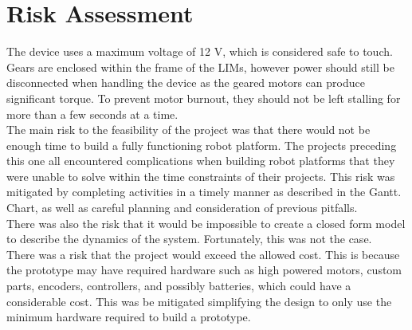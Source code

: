\chapter{Risk Assessment}

The device uses a maximum voltage of 12 V, which is considered safe to touch. Gears are enclosed within the frame of the LIMs, however power should still be disconnected when handling the device as the geared motors can produce significant torque. To prevent motor burnout, they should not be left stalling for more than a few seconds at a time.\\

\noindent The main risk to the feasibility of the project was that there would not be enough time to build a fully functioning robot platform. The projects preceding this one all encountered complications when building robot platforms that they were unable to solve within the time constraints of their projects. This risk was mitigated by completing activities in a timely manner as described in the Gantt. Chart, as well as careful planning and consideration of previous pitfalls.
\\

\noindent There was also the risk that it would be impossible to create a closed form model to describe the dynamics of the system. Fortunately, this was not the case.\\

\noindent There was a risk that the project would exceed the allowed cost. This is because the prototype may have required hardware such as high powered motors, custom parts, encoders, controllers, and possibly batteries, which could have a considerable cost. This was be mitigated simplifying the design to only use the minimum hardware required to build a prototype.\\

